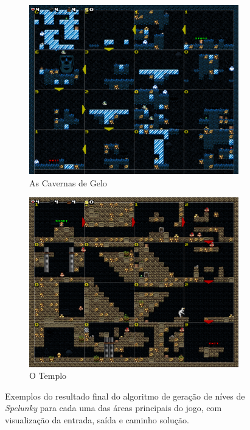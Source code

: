 \begin{figure}[H]
	\begin{subfigure}[b]{0.36\textwidth}
		\includegraphics[width=\textwidth]{fig/spelunky-ice-example.pdf}
		\caption{As Cavernas de Gelo}
		\label{fig:spelunky-ice-example2}
	\end{subfigure}
	\begin{subfigure}[b]{0.36\textwidth}
		\includegraphics[width=\textwidth]{fig/spelunky-temple-example.pdf}
		\caption{O Templo}
		\label{fig:spelunky-temple-example}
	\end{subfigure}
	\caption{Exemplos do resultado final do algoritmo de geração de níves de
	\textit{Spelunky} para cada uma das áreas principais do jogo, com
	visualização da entrada, saída e caminho solução.}
	\label{fig:spelunky-procgen-examples}
\end{figure}


